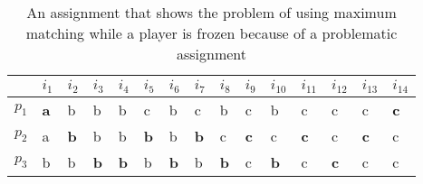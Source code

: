 \begin{table}[h]
\centering
\begin{tabular}{lllllllllllllll}
                            & $i_1$                           & $i_2$                           & $i_3$                           & $i_4$                           & $i_5$                           & $i_6$                           & $i_7$                           & $i_8$                           & $i_9$                           & $i_{10}$                        & $i_{11}$                        & $i_{12}$                        & $i_{13}$                        & $i_{14}$                        \\ \hline
\multicolumn{1}{|l|}{$p_1$} & \multicolumn{1}{l|}{\textbf{a}} & \multicolumn{1}{l|}{b}          & \multicolumn{1}{l|}{b}          & \multicolumn{1}{l|}{b}          & \multicolumn{1}{l|}{c}          & \multicolumn{1}{l|}{b}          & \multicolumn{1}{l|}{c}          & \multicolumn{1}{l|}{b}          & \multicolumn{1}{l|}{c}          & \multicolumn{1}{l|}{b}          & \multicolumn{1}{l|}{c}          & \multicolumn{1}{l|}{c}          & \multicolumn{1}{l|}{c}          & \multicolumn{1}{l|}{\textbf{c}} \\ \hline
\multicolumn{1}{|l|}{$p_2$} & \multicolumn{1}{l|}{a}          & \multicolumn{1}{l|}{\textbf{b}} & \multicolumn{1}{l|}{b}          & \multicolumn{1}{l|}{b}          & \multicolumn{1}{l|}{\textbf{b}} & \multicolumn{1}{l|}{b}          & \multicolumn{1}{l|}{\textbf{b}} & \multicolumn{1}{l|}{c}          & \multicolumn{1}{l|}{\textbf{c}} & \multicolumn{1}{l|}{c}          & \multicolumn{1}{l|}{\textbf{c}} & \multicolumn{1}{l|}{c}          & \multicolumn{1}{l|}{\textbf{c}} & \multicolumn{1}{l|}{c}          \\ \hline
\multicolumn{1}{|l|}{$p_3$} & \multicolumn{1}{l|}{b}          & \multicolumn{1}{l|}{b}          & \multicolumn{1}{l|}{\textbf{b}} & \multicolumn{1}{l|}{\textbf{b}} & \multicolumn{1}{l|}{b}          & \multicolumn{1}{l|}{\textbf{b}} & \multicolumn{1}{l|}{b}          & \multicolumn{1}{l|}{\textbf{b}} & \multicolumn{1}{l|}{c}          & \multicolumn{1}{l|}{\textbf{b}} & \multicolumn{1}{l|}{c}          & \multicolumn{1}{l|}{\textbf{c}} & \multicolumn{1}{l|}{c}          & \multicolumn{1}{l|}{c}          \\ \hline
\end{tabular}
\caption{An assignment that shows the problem of using maximum matching while a player is frozen because of a problematic assignment}
\label{table:example-maximum-matching-problem}
\end{table}

